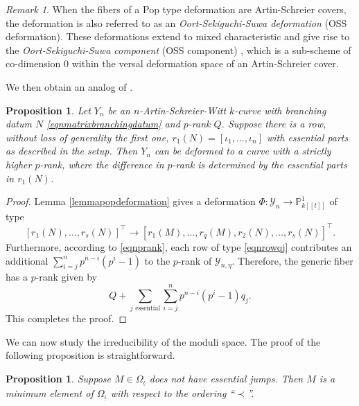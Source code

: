 \documentclass{compositio}
\newtheorem{proposition}[theorem]{Proposition}
\theoremstyle{remark}
\theoremstyle{remark}
\newtheorem{remark}[theorem]{Remark}
\begin{document}
\begin{remark}
When the fibers of a Pop type deformation are Artin-Schreier covers, the deformation is also referred to as an \textit{Oort-Sekiguchi-Suwa deformation} (OSS deformation). These deformations extend to mixed characteristic and give rise to the \textit{Oort-Sekiguchi-Suwa component} (OSS component) \cite[\S 4.3]{MR1767273}, which is a sub-scheme of co-dimension $0$ within the versal deformation space of an Artin-Schreier cover.
\end{remark}

We then obtain an analog of \cite[Proposition 4.2]{MR2985514}.

\begin{proposition}
Let $Y_n$ be an $n$-Artin-Schreier-Witt $k$-curve with branching datum $N$ \eqref{eqnmatrixbranchingdatum} and $p$-rank $Q$. Suppose there is a row, without loss of generality the first one, $r_1(N) = [\iota_1, \ldots, \iota_n]$ with essential parts as described in the setup. Then $Y_n$ can be deformed to a curve with a strictly higher $p$-rank, where the difference in $p$-rank is determined by the essential parts in $r_1(N)$.
\end{proposition}

\begin{proof}
    Lemma \ref{lemmapopdeformation} gives a deformation $\Phi: \mathscr{Y}_n \xrightarrow{} \mathbb{P}^1_{k[[t]]}$ of type $$[r_1(N), \ldots, r_s(N)]^{\top} \rightarrow [r_{1}(M), \ldots, r_{q}(M), r_2(N), \ldots, r_s(N)]^{\top}.$$ 
    Furthermore, according to \eqref{eqnprank}, each row of type \eqref{eqnrowqj} contributes an additional $\sum_{i=j}^n p^{n-i} (p^i-1)$ to the $p$-rank of $\mathscr{Y}_{n, \eta}$. Therefore, the generic fiber has a $p$-rank given by
    \begin{equation*}
        Q + \sum_{j \text{ essential}} \sum_{i=j}^n p^{n-i} (p^i-1) q_j.
    \end{equation*}
    This completes the proof.
\end{proof}

We can now study the irreducibility of the moduli space. The proof of the following proposition is straightforward.

\begin{proposition}
\label{propminimumbranchingdatum}
Suppose $M \in \Omega_{\underline{\iota}}$ does not have essential jumps. Then $M$ is a minimum element of $\Omega_{\underline{\iota}}$ with respect to the ordering ``$\prec$''.
\end{proposition}
\end{document}
